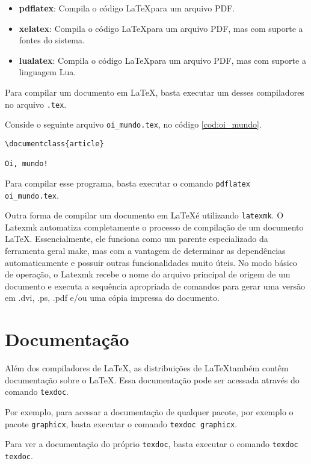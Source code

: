 \begin{itemize}
    \item \textbf{pdflatex}: Compila o código \LaTeX para um arquivo PDF.
    \item \textbf{xelatex}: Compila o código \LaTeX para um arquivo PDF, mas com suporte a fontes do sistema.
    \item \textbf{lualatex}: Compila o código \LaTeX para um arquivo PDF, mas com suporte a linguagem Lua.
\end{itemize}

Para compilar um documento em \LaTeX, basta executar um desses compiladores no arquivo \texttt{.tex}.

Conside o seguinte arquivo \texttt{oi\_mundo.tex}, no código \ref{cod:oi_mundo}.

\begin{lstlisting}[language={[latex]TeX}, caption=exemplo.tex, label=cod:oi_mundo]
\documentclass{article}

Oi, mundo!

\end{lstlisting}

Para compilar esse programa, basta executar o comando \texttt{pdflatex oi\_mundo.tex}.


Outra forma de compilar um documento em \LaTeX é utilizando \texttt{latexmk}. O Latexmk automatiza completamente o processo de compilação de um documento LaTeX. Essencialmente, ele funciona como um parente especializado da ferramenta geral make, mas com a vantagem de determinar as dependências automaticamente e possuir outras funcionalidades muito úteis. No modo básico de operação, o Latexmk recebe o nome do arquivo principal de origem de um documento e executa a sequência apropriada de comandos para gerar uma versão em .dvi, .ps, .pdf e/ou uma cópia impressa do documento.


\section{Documentação}

Além dos compiladores de \LaTeX, as distribuições de \LaTeX também contêm documentação sobre o \LaTeX. Essa documentação pode ser acessada através do comando \texttt{texdoc}.

Por exemplo, para acessar a documentação de qualquer pacote, por exemplo o pacote \texttt{graphicx}, basta executar o comando \texttt{texdoc graphicx}.

Para ver a documentação do próprio \texttt{texdoc}, basta executar o comando \texttt{texdoc texdoc}.
